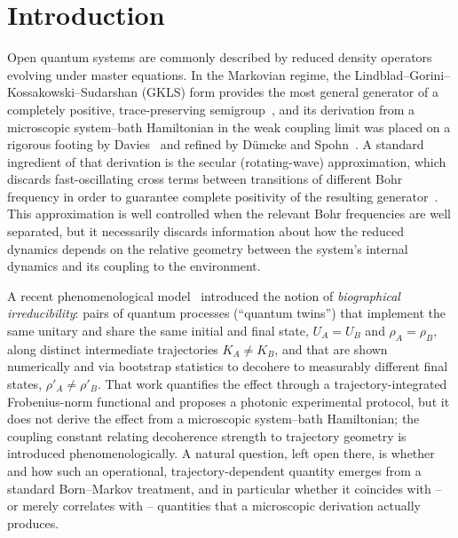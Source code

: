 \documentclass[aps,pra,reprint,superscriptaddress,nofootinbib,longbibliography]{revtex4-2}
\begin{document}
\begin{abstract}
These results provide an exact microscopic benchmark for
trajectory-dependent effective decoherence models: the angular
dependence originates from the geometry of the system--environment
coupling and the evolving state, not from an intrinsic angular
preference of the bath, while a full reduction of the phenomenological
model of Ref.~\cite{rodrigues2025} to this microscopic setting remains
open.

\end{abstract}


\maketitle


\section{Introduction}
\label{sec:intro}

Open quantum systems are commonly described by reduced density
operators evolving under master equations. In the Markovian regime,
the Lindblad--Gorini--Kossakowski--Sudarshan (GKLS) form provides the
most general generator of a completely positive, trace-preserving
semigroup~\cite{gorini1976completely,lindblad1976generators}, and its
derivation from a microscopic system--bath Hamiltonian in the weak
coupling limit was placed on a rigorous footing by
Davies~\cite{davies1974markovian} and refined by D\"umcke and
Spohn~\cite{dumcke1979proper}. A standard ingredient of that
derivation is the secular (rotating-wave) approximation, which
discards fast-oscillating cross terms between transitions of different
Bohr frequency in order to guarantee complete positivity of the
resulting generator~\cite{breuer2002open,weiss2012quantum,gorini1976completely}. This
approximation is well controlled when the relevant Bohr frequencies
are well separated, but it necessarily discards information about how
the reduced dynamics depends on the relative geometry between the
system's internal dynamics and its coupling to the environment.

A recent phenomenological model~\cite{rodrigues2025} introduced the
notion of \emph{biographical irreducibility}: pairs of quantum
processes (``quantum twins'') that implement the same unitary and
share the same initial and final state, $U_A=U_B$ and
$\rho_A=\rho_B$, along distinct intermediate trajectories
$K_A\neq K_B$, and that are shown numerically and via bootstrap
statistics to decohere to measurably different final states,
$\rho'_A\neq\rho'_B$. That work quantifies the effect through a
trajectory-integrated Frobenius-norm functional and proposes a
photonic experimental protocol, but it does not derive the effect from
a microscopic system--bath Hamiltonian; the coupling constant relating
decoherence strength to trajectory geometry is introduced
phenomenologically. A natural question, left open there, is whether
and how such an operational, trajectory-dependent quantity emerges
from a standard Born--Markov treatment, and in particular whether it
coincides with -- or merely correlates with -- quantities that a
microscopic derivation actually produces.
\end{document}
